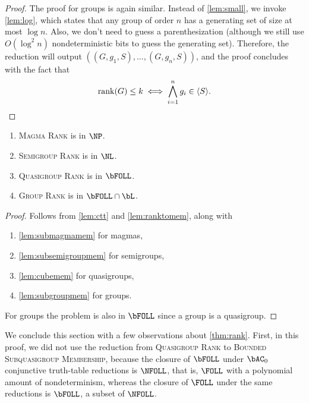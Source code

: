 \documentclass{article}
\newcommand{\todo}[1]{\textbf{TODO #1}}
\newcommand{\gen}[1]{\langle #1 \rangle}
\DeclareMathOperator{\rank}{rank}
\begin{document}
\begin{proof}
  The proof for groups is again similar.
  Instead of \autoref{lem:small}, we invoke \autoref{lem:log}, which states that any group of order $n$ has a generating set of size at most $\log n$.
  Also, we don't need to guess a parenthesization (although we still use $O(\log^2 n)$ nondeterministic bits to guess the generating set).
  Therefore, the reduction will output $((G, g_1, S), \dotsc, (G, g_n, S))$, and the proof concludes with the fact that
  \begin{equation*}
    \rank(G) \leq k \iff \bigwedge_{i = 1}^n g_i \in \gen{S}.
    \qedhere
  \end{equation*}
\end{proof}


\begin{theorem}\label{thm:rank}
  \mbox{}
  \begin{enumerate}
  \item \textsc{Magma Rank} is in $\NP$.
  \item \textsc{Semigroup Rank} is in $\NL$.
  \item \textsc{Quasigroup Rank} is in $\bFOLL$.
  \item \textsc{Group Rank} is in $\bFOLL \cap \bL$.
  \end{enumerate}
\end{theorem}
\begin{proof}
  Follows from \autoref{lem:ctt} and \autoref{lem:ranktomem}, along with
  \begin{enumerate}
  \item \autoref{lem:submagmamem} for magmas,
  \item \autoref{lem:subsemigroupmem} for semigroups,
  \item \autoref{lem:cubemem} for quasigroups,
  \item \autoref{lem:subgroupmem} for groups.
  \end{enumerate}
  For groups the problem is also in $\bFOLL$ since a group is a quasigroup.
\end{proof}

We conclude this section with a few observations about \autoref{thm:rank}.
First, in this proof, we did not use the reduction from \textsc{Quasigroup Rank} to \textsc{Bounded Subquasigroup Membership}, because the closure of $\bFOLL$ under $\bAC_0$ conjunctive truth-table reductions is $\NFOLL$, that is, $\FOLL$ with a polynomial amount of nondeterminism, whereas the closure of $\FOLL$ under the same reductions is $\bFOLL$, a subset of $\NFOLL$.
\end{document}
